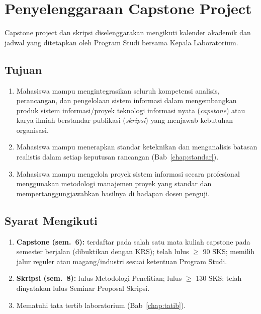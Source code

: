 \documentclass[12pt,a4paper]{report}
\begin{document}
\chapter{Penyelenggaraan Capstone Project}

Capstone project dan skripsi diselenggarakan mengikuti kalender akademik dan jadwal yang ditetapkan oleh Program Studi bersama Kepala Laboratorium.

\section{Tujuan}
\begin{enumerate}
\item Mahasiswa mampu mengintegrasikan seluruh kompetensi analisis, perancangan, dan pengelolaan sistem informasi dalam mengembangkan produk sistem informasi/proyek teknologi informasi nyata (\emph{capstone}) atau karya ilmiah berstandar publikasi (\emph{skripsi}) yang menjawab kebutuhan organisasi.
\item Mahasiswa mampu menerapkan standar keteknikan dan menganalisis batasan realistis dalam setiap keputusan rancangan (Bab~\ref{chap:standar}).
\item Mahasiswa mampu mengelola proyek sistem informasi secara profesional menggunakan metodologi manajemen proyek yang standar dan mempertanggungjawabkan hasilnya di hadapan dosen penguji.
\end{enumerate}

\section{Syarat Mengikuti}
\begin{enumerate}
\item \textbf{Capstone (sem.~6):} terdaftar pada salah satu mata kuliah capstone pada semester berjalan (dibuktikan dengan KRS); telah lulus $\geq$ 90 SKS; memilih jalur reguler atau magang/industri sesuai ketentuan Program Studi.
\item \textbf{Skripsi (sem.~8):} lulus Metodologi Penelitian; lulus $\geq$ 130 SKS; telah dinyatakan lulus Seminar Proposal Skripsi.
\item Mematuhi tata tertib laboratorium (Bab~\ref{chap:tatib}).
\end{enumerate}
\end{document}
